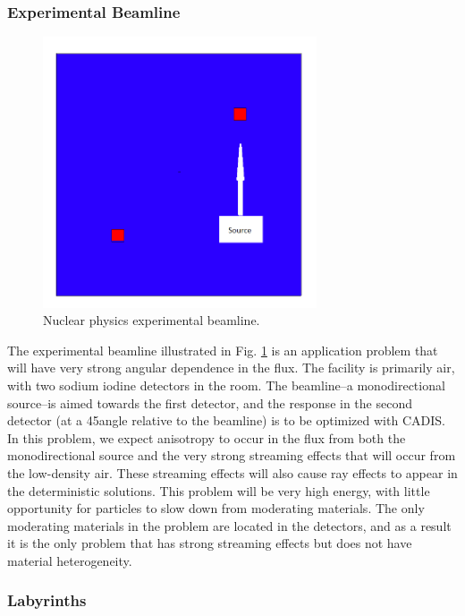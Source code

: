\subsubsection*{Experimental Beamline}

\begin{figure}[h!]
  \centering
  \includegraphics[height=8cm]{./chapters/characterization_probs/figures/geometries/beam.png}
  \caption[Nuclear physics experimental beamline.]{Nuclear physics experimental beamline.}
  \label{fig:beamgeom}
\end{figure}

The experimental beamline illustrated in Fig. \ref{fig:beamgeom} is an
application problem that will have very strong angular dependence in the flux. The
facility is primarily air, with two sodium iodine detectors in the room. The
beamline--a monodirectional source--is aimed towards the first detector, and
the response in the second detector (at a 45\degree angle
relative to the beamline) is to be optimized with CADIS. In this problem, we
expect anisotropy to occur in the flux from both the monodirectional source and
the very strong streaming effects that will occur from the low-density air.
These streaming effects will also cause ray effects to appear in the
deterministic solutions. This
problem will be very high energy, with little opportunity for particles to
slow down from moderating materials. The only moderating materials in the
problem are located in the detectors, and as a result it is the only problem
that has strong streaming effects but does not have material heterogeneity.

\subsubsection*{Labyrinths}

